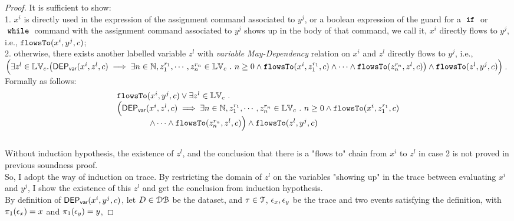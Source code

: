 \begin{proof}
  It is sufficient to show:
  \\
  1. $x^i$ is directly used in the expression of the assignment command associated to $y^j$, or a boolean
  expression of the guard for a $\;\mathtt{if}\;$ or $\;\mathtt{while}\;$ command with the assignment command associated to $y^j$ shows up in the body of that command, 
  we call it, $x^i$ directly flows to $y^j$,
  i.e.,
  $ \mathtt{flowsTo}(x^i, y^j, {c})$;
  \\
  2. otherwise, there exists another labelled variable $z^l$ with \emph{variable May-Dependency} relation on $x^i$ and 
  $z^l$ directly flows to $y^j$, i.e., 
  \\
  $\Big(
    \exists z^l \in \lvar_{{c}}.
  \left(\vardep(x^i, z^l, {c})   
  \implies
   \exists n \in \mathbb{N}, z_1^{r_1}, \cdots, z_n^{r_n} \in \lvar_{{c}} \st n \geq 0 \land
  \flowsto(x^i,  z_1^{r_1}, c) 
  \land \cdots \land \flowsto(z_n^{r_n}, z^l, c)
  \right)
  \land  \flowsto(z^l, y^j, {c})
  \Big)$.
%
\\ Formally as follows:
\[
  \begin{array}{l}
    \mathtt{flowsTo}(x^i, y^j, {c})
    \lor 
      \exists z^l \in \mathbb{LV}_{{c}} ~.~
    \\
    \Big(
    \mathsf{DEP_{var}}(x^i, z^l, {c})   
  \implies
     \exists n \in \mathbb{N}, z_1^{r_1}, \cdots, z_n^{r_n} \in \mathbb{LV}_{{c}} ~.~ n \geq 0 \land
    \mathtt{flowsTo}(x^i,  z_1^{r_1}, c) 
    \\ \qquad \qquad 
    \land \cdots  \land \mathtt{flowsTo}(z_n^{r_n}, z^l, c) 
    \Big)
    \land  \mathtt{flowsTo}(z^l, y^j, {c})
  \end{array}
  \]
\\
%
Without induction hypothesis, the existence of $z^l$, and the conclusion that there is a "flows to" chain from $x^i$ to $z^l$ in case 2 is not proved in previous soundness proof.
\\
%
So, I adopt the way of induction on trace.
By restricting the domain of $z^l$ on the variables "showing up" in the 
trace between evaluating $x^i$ and $y^j$, I show the existence of this $z^l$ and get the conclusion from induction hypothesis. 
\\
    By definition of $\mathsf{DEP_{var}}(x^i, y^j, {c})$, 
let $D \in \mathcal{DB}$ be the dataset,
and $\mathtt{\tau} \in \mathcal{T}$, $\mathtt{\epsilon}_x, \mathtt{\epsilon}_y$ be the trace and two events satisfying the definition, 
with $\pi_1(\mathtt{\epsilon}_x) = x$ and $\pi_1(\mathtt{\epsilon}_y) = y$,

\end{proof}
